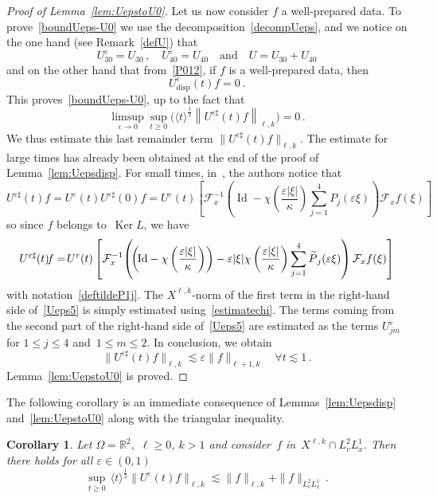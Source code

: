 \documentclass[11pt]{article}
\newtheorem{coro}[theo]{Corollary}
\theoremstyle{definition}
\numberwithin{equation}{section}
\numberwithin{figure}{section}
\numberwithin{table}{section}
\newcommand*\R {\mathbb{R}}
\newcommand*\eps{{\varepsilon}}
\newcommand*\e{{\varepsilon}}
\DeclareMathOperator{\disp}{disp}
\DeclareMathOperator{\Id}{Id}
\let\oldforall\forall
\renewcommand*{\forall}{\mathrel{\oldforall}}
\let\oldtilde\tilde
\renewcommand*{\tilde}[1]{\mathchoice{\widetilde{#1}}{\widetilde{#1}}{\oldtilde{#1}}{\oldtilde{#1}}}
\begin{document}
\begin{proof}[Proof of Lemma~\ref{lem:UepstoU0}]
Let us now consider $f$ a well-prepared data. To prove~\eqref{boundUeps-U0} we use the decomposition~\eqref{decompUeps}, and we notice on the one hand (see Remark~\ref{defU}) that
\[
U^\e_{30} = U_{30} \,, \quad U^\e_{40}=
U_{40}\quad \text{and}\quad U = U_{30}+U_{40}
\]
and on the other hand that from~\eqref{P012}, if $f$ is a well-prepared data, then
\[
U^\eps_{\disp}(t) f=0\,.
\]
This proves~\eqref{boundUeps-U0}, up to the fact that
\[
\limsup_{\eps\to0} \sup_{t \ge 0} \big(\langle t \rangle^{\frac12} \left\|U^{\eps \sharp}(t) f \right\|_{\ell,k} \big)= 0 \,.
\]
We thus estimate this last remainder term $\|U^{\eps \sharp}(t) f\|_{\ell,k}$. The estimate for large times has already been obtained at the end of the proof of Lemma~\ref{lem:Uepsdisp}. For small times, in~\cite[Lemma~6.2]{Bardos-Ukai}, the authors notice that
\[
U^{\eps \sharp}(t)f = U^\eps(t)U^{\eps \sharp}(0) f= U^\eps(t) \left[\mathcal{F}_x^{-1} \left({\Id}-\chi\left(\frac{\eps|\xi|}\kappa\right)\sum_{j=1}^4 P_j(\eps\xi)\right) \mathcal{F}_x{f (\xi)} \right]
\]
so since $f$ belongs to~$ \operatorname{Ker} L$, we have
\begin{equation}\label{Ueps5}
U^{\eps \sharp}(t)\!f =\!U^\eps(t) \left[\mathcal{F}_x^{-1}\!\left(\!\left(\!{\Id}-\chi\left(\frac{\eps|\xi|}\kappa\right)\right) - \eps |\xi| \chi\left(\frac{\eps|\xi|}\kappa\right) \sum_{j=1}^4 \tilde P_{j} (\eps \xi)\right) \mathcal{F}_x{f (\xi)}\right]
\end{equation}
with notation~\eqref{deftildeP1j}. The $X^{\ell,k}$-norm of the first term in the right-hand side of~\eqref{Ueps5} is simply estimated using~\eqref{estimatechi}. The terms coming from the second part of the right-hand side of~\eqref{Ueps5} are estimated as the terms $U^\eps_{jm}$ for $1 \le j \le 4$ and~$1 \leq m \leq 2$. In conclusion, we obtain
\[
\|U^{\eps \sharp}(t)f\|_{\ell,k} \lesssim \eps \| f\|_{\ell+1,k}\quad \forall t \lesssim 1 \,.
\]
Lemma~\ref{lem:UepstoU0} is proved.
\end{proof}

The following corollary is an immediate consequence of Lemmas~\ref{lem:Uepsdisp} and~\ref{lem:UepstoU0} along with the triangular inequality.

\begin{coro}\label{estimateUepsd=2}
Let $\Omega = \R^2$,~$\ell \ge0$, ${k>1}$ and consider~$f$ in~$X^{\ell,k} \cap L^{2}_v L^1_x$. Then there holds for all $\eps \in (0,1)$
\[
\sup_{t \ge 0} \, \langle t \rangle^{\frac12} \big\| U^\eps (t)f\big \|_{\ell,k} \lesssim \|f\|_{\ell,k} + \|f\|_{L^{2}_v L^1_x} \,.
\]
\end{coro}
\end{document}
